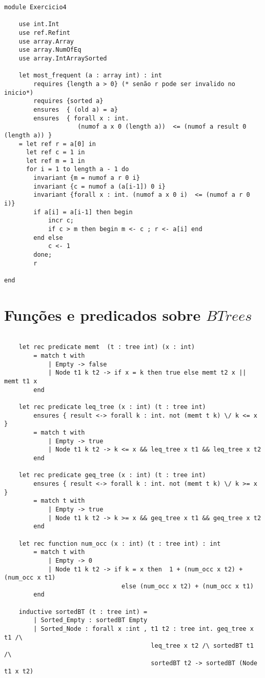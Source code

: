 \documentclass[12pt]{article}
\begin{document}
\begin{verbatim}
module Exercicio4 

    use int.Int
    use ref.Refint
    use array.Array
    use array.NumOfEq
    use array.IntArraySorted

    let most_frequent (a : array int) : int
        requires {length a > 0} (* senão r pode ser invalido no inicio*)
        requires {sorted a}             
        ensures  { (old a) = a}
        ensures  { forall x : int. 
                    (numof a x 0 (length a))  <= (numof a result 0 (length a)) }
    = let ref r = a[0] in 
      let ref c = 1 in
      let ref m = 1 in 
      for i = 1 to length a - 1 do
        invariant {m = numof a r 0 i}
        invariant {c = numof a (a[i-1]) 0 i}
        invariant {forall x : int. (numof a x 0 i)  <= (numof a r 0 i)}
        if a[i] = a[i-1] then begin
            incr c;
            if c > m then begin m <- c ; r <- a[i] end
        end else
            c <- 1
        done;
        r

end
\end{verbatim}




\newpage
\appendix

\section{Funções e predicados sobre $BTrees$}\label{bter}
\begin{verbatim}

    let rec predicate memt  (t : tree int) (x : int)
        = match t with
            | Empty -> false
            | Node t1 k t2 -> if x = k then true else memt t2 x || memt t1 x
        end

    let rec predicate leq_tree (x : int) (t : tree int)
        ensures { result <-> forall k : int. not (memt t k) \/ k <= x }
        = match t with
            | Empty -> true
            | Node t1 k t2 -> k <= x && leq_tree x t1 && leq_tree x t2
        end

    let rec predicate geq_tree (x : int) (t : tree int)
        ensures { result <-> forall k : int. not (memt t k) \/ k >= x }
        = match t with
            | Empty -> true
            | Node t1 k t2 -> k >= x && geq_tree x t1 && geq_tree x t2
        end

    let rec function num_occ (x : int) (t : tree int) : int
        = match t with
            | Empty -> 0
            | Node t1 k t2 -> if k = x then  1 + (num_occ x t2) + (num_occ x t1) 
                                else (num_occ x t2) + (num_occ x t1)
        end

    inductive sortedBT (t : tree int) = 
        | Sorted_Empty : sortedBT Empty
        | Sorted_Node : forall x :int , t1 t2 : tree int. geq_tree x t1 /\ 
                                        leq_tree x t2 /\ sortedBT t1 /\
                                        sortedBT t2 -> sortedBT (Node t1 x t2)


\end{verbatim}
\end{document}
